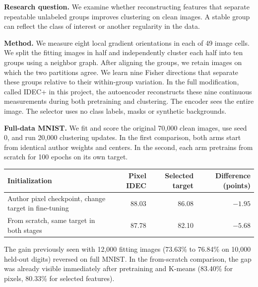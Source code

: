 \newpage
{}

\textbf{Research question.} We examine whether reconstructing features that separate repeatable unlabeled groups improves clustering on clean images. A stable group can reflect the class of interest or another regularity in the data.

\textbf{Method.} We measure eight local gradient orientations in each of 49 image cells. We split the fitting images in half and independently cluster each half into ten groups using a neighbor graph. After aligning the groups, we retain images on which the two partitions agree. We learn nine Fisher directions that separate these groups relative to their within-group variation. In the full modification, called IDEC+ in this project, the autoencoder reconstructs these nine continuous measurements during both pretraining and clustering. The encoder sees the entire image. The selector uses no class labels, masks or synthetic backgrounds.

\textbf{Full-data MNIST.} We fit and score the original 70,000 clean images, use seed 0, and run 20,000 clustering updates. In the first comparison, both arms start from identical author weights and centers. In the second, each arm pretrains from scratch for 100 epochs on its own target.

\begin{center}\small
\begin{tabular}{lrrr}\toprule
Initialization & Pixel IDEC & Selected target & Difference (points)\\\midrule
Author pixel checkpoint, change target in fine-tuning & 88.03 & 86.08 & $-1.95$\\
From scratch, same target in both stages & 87.78 & 82.10 & $-5.68$\\\bottomrule
\end{tabular}
\end{center}

The gain previously seen with 12,000 fitting images (73.63\% to 76.84\% on 10,000 held-out digits) reversed on full MNIST. In the from-scratch comparison, the gap was already visible immediately after pretraining and K-means (83.40\% for pixels, 80.33\% for selected features).

